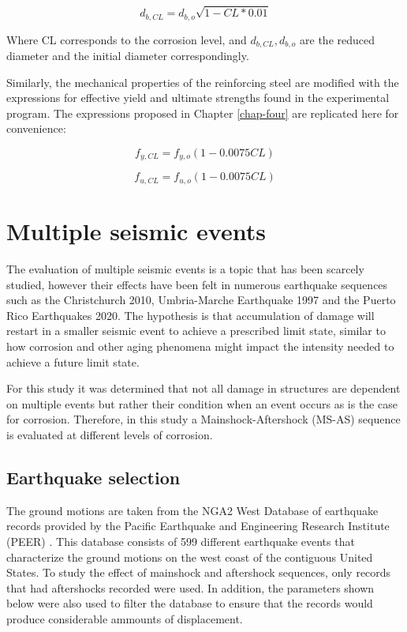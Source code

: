 \begin{equation}
    d_{b,CL} = d_{b,o} \sqrt{1 - CL*0.01}
    \label{eq:d_eff}
\end{equation}

Where CL corresponds to the corrosion level, and $d_{b,CL}, d_{b,o}$ are the reduced diameter and the initial diameter correspondingly. 

Similarly, the mechanical properties of the reinforcing steel are modified with the expressions for effective yield and ultimate strengths found in the experimental program. The expressions proposed in Chapter \ref{chap-four} are replicated here for convenience:

\begin{equation}
    f_{y,CL} = f_{y,o}(1-0.0075CL)
    \label{eq.Calderon_Fy_vs_CL_5}
\end{equation}

\begin{equation}
    f_{u,CL} = f_{u,o}(1-0.0075CL)
    \label{eq.Calderon_Fu_vs_CL_5}
\end{equation}

\section{Multiple seismic events}

The evaluation of multiple seismic events is a topic that has been scarcely studied, however their effects have been felt in numerous earthquake sequences such as the Christchurch 2010, Umbria-Marche Earthquake 1997 and the Puerto Rico Earthquakes 2020. The hypothesis is that accumulation of damage will restart in a smaller seismic event to achieve a prescribed limit state, similar to how corrosion and other aging phenomena might impact the intensity needed to achieve a future limit state. 

For this study it was determined that not all damage in structures are dependent on multiple events but rather their condition when an event occurs as is the case for corrosion. Therefore, in this study a Mainshock-Aftershock (MS-AS) sequence is evaluated at different levels of corrosion.

\subsection{Earthquake selection}

The ground motions are taken from the NGA2 West Database of earthquake records provided by the Pacific Earthquake and Engineering Research Institute (PEER) \cite{Ancheta2014}. This database consists of 599 different earthquake events that characterize the ground motions on the west coast of the contiguous United States. To study the effect of mainshock and aftershock sequences, only records that had aftershocks recorded were used. In addition, the parameters shown below were also used to filter the database to ensure that the records would produce considerable ammounts of displacement.


